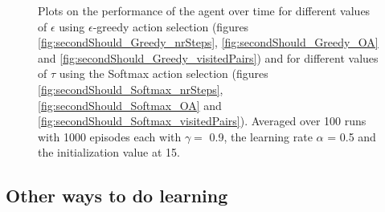 \documentclass{article}
\begin{document}
\begin{figure}[ht]
{    \label{fig:secondShould_Softmax_OA}
}
\caption{Plots on the performance of the agent over time for different values of $\epsilon$ using $\epsilon$-greedy action selection (figures \ref{fig:secondShould_Greedy_nrSteps}, \ref{fig:secondShould_Greedy_OA} and \ref{fig:secondShould_Greedy_visitedPairs}) and for different values of $\tau$ using the Softmax action selection (figures \ref{fig:secondShould_Softmax_nrSteps}, \ref{fig:secondShould_Softmax_OA} and \ref{fig:secondShould_Softmax_visitedPairs}). Averaged over 100 runs with 1000 episodes each with $\gamma = $ 0.9, the learning rate $\alpha$ = 0.5 and the initialization value at 15.}
\label{plot:secondShould}
\end{figure}

\subsection{Other ways to do learning}
\end{document}

